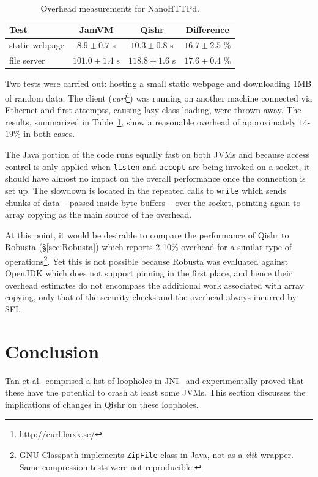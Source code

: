 \documentclass[a4paper,12pt,twoside,openright]{report}
\newcommand{\class}[1]{\texttt{#1}}
\begin{document}
\begin{table}
	\centering
	\scriptsize
	\begin{tabular}{|l|c|c|c|}
		\hline
		\bf Test			& \bf JamVM			& \bf Qishr			& \bf Difference \\
		\hline
		static webpage		& $8.9 \pm 0.7$ s		& $10.3 \pm 0.8$ s 		& $16.7 \pm 2.5$ \% \\
		file server			& $101.0 \pm 1.4$ s		& $118.8 \pm 1.6$ s 	& $17.6 \pm 0.4$ \% \\
		\hline
	\end{tabular}
	\caption{Overhead measurements for NanoHTTPd.}
	\label{table:OverheadNanoHTTPd}
\end{table}

Two tests were carried out: hosting a small static webpage and downloading 1MB of random data. The client (\emph{curl}\footnote{http://curl.haxx.se/}) was running on another machine connected via Ethernet and first attempts, causing lazy class loading, were thrown away. The results, summarized in Table~\ref{table:OverheadNanoHTTPd}, show a reasonable overhead of approximately $14$-$19\%$ in both cases.

The Java portion of the code runs equally fast on both JVMs and because access control is only applied when \texttt{listen} and \texttt{accept} are being invoked on a socket, it should have almost no impact on the overall performance once the connection is set up. The slowdown is located in the repeated calls to \texttt{write} which sends chunks of data -- passed inside byte buffers -- over the socket, pointing again to array copying as the main source of the overhead.

At this point, it would be desirable to compare the performance of Qishr to Robusta (\S\ref{sec:Robusta}) which reports 2-10\% overhead for a similar type of operations\footnote{GNU Classpath implements \class{ZipFile} class in Java, not as a \emph{zlib} wrapper. Same compression tests were not reproducible.}. Yet this is not possible because Robusta was evaluated against OpenJDK which does not support pinning in the first place, and hence their overhead estimates do not encompass the additional work associated with array copying, only that of the security checks and the overhead always incurred by SFI.

\chapter{Conclusion} 

Tan et al.\ comprised a list of loopholes in JNI~\cite{Tan06safejava} and experimentally proved that these have the potential to crash at least some JVMs. This section discusses the implications of changes in Qishr on these loopholes.
\end{document}
